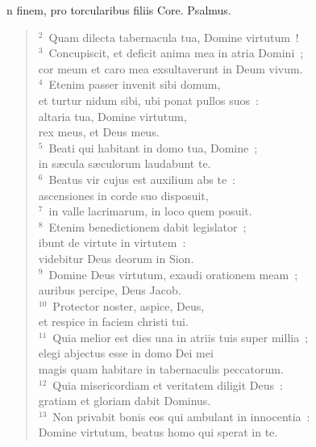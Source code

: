 \bchapter
{}n finem, pro torcularibus filiis Core. Psalmus.
\begin{flushleft}\begin{verse}\vspace{6pt}${}^{2}$~Quam dilecta tabernacula tua, Domine virtutum~!\\
${}^{3}$~Concupiscit, et deficit anima mea in atria Domini~;\\ cor meum et caro mea exsultaverunt in Deum vivum.\\
${}^{4}$~Etenim passer invenit sibi domum,\\ et turtur nidum sibi, ubi ponat pullos suos~:\\ altaria tua, Domine virtutum,\\ rex meus, et Deus meus.\\
${}^{5}$~Beati qui habitant in domo tua, Domine~;\\ in s\ae cula s\ae culorum laudabunt te.\\
${}^{6}$~Beatus vir cujus est auxilium abs te~:\\ ascensiones in corde suo disposuit,\\
${}^{7}$~in valle lacrimarum, in loco quem posuit.\\
${}^{8}$~Etenim benedictionem dabit legislator~;\\ ibunt de virtute in virtutem~:\\ videbitur Deus deorum in Sion.\\
${}^{9}$~Domine Deus virtutum, exaudi orationem meam~;\\ auribus percipe, Deus Jacob.\\
${}^{10}$~Protector noster, aspice, Deus,\\ et respice in faciem christi tui.\\
${}^{11}$~Quia melior est dies una in atriis tuis super millia~;\\ elegi abjectus esse in domo Dei mei\\ magis quam habitare in tabernaculis peccatorum.\\
${}^{12}$~Quia misericordiam et veritatem diligit Deus~:\\ gratiam et gloriam dabit Dominus.\\
${}^{13}$~Non privabit bonis eos qui ambulant in innocentia~:\\ Domine virtutum, beatus homo qui sperat in te.\end{verse}\end{flushleft}



